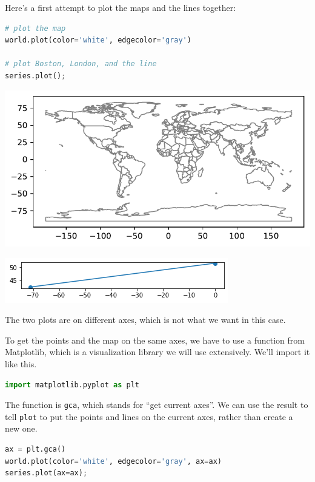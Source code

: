 Here's a first attempt to plot the maps and the lines together:

\begin{lstlisting}[language=Python,style=source]
# plot the map
world.plot(color='white', edgecolor='gray')

# plot Boston, London, and the line
series.plot();
\end{lstlisting}

\begin{center}
\includegraphics[scale=0.75]{02_times_files/02_times_127_0.pdf}
\end{center}

\begin{center}
\includegraphics[scale=0.75]{02_times_files/02_times_127_1.png}
\end{center}

The two plots are on different axes, which is not what we want in this
case.

To get the points and the map on the same axes, we have to use a
function from Matplotlib, which is a visualization library we will use
extensively. We'll import it like this.

\begin{lstlisting}[language=Python,style=source]
import matplotlib.pyplot as plt
\end{lstlisting}

The function is \passthrough{\lstinline!gca!}, which stands for ``get
current axes''. We can use the result to tell
\passthrough{\lstinline!plot!} to put the points and lines on the
current axes, rather than create a new one.

\begin{lstlisting}[language=Python,style=source]
ax = plt.gca()
world.plot(color='white', edgecolor='gray', ax=ax)
series.plot(ax=ax);
\end{lstlisting}


